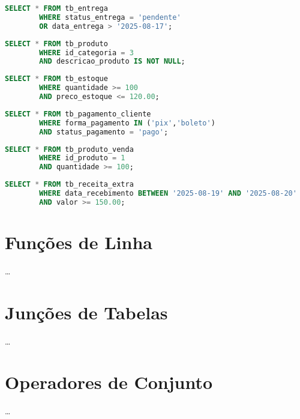 \documentclass[
12pt,
a4paper,
semrecuonosumario,
sumario = abnt-6027-2012]{report}
\begin{document}
    \begin{lstlisting}[language=SQL,caption={SELECT -- Tabela \texttt{tb\_entrega}}]
        SELECT * FROM tb_entrega
        WHERE status_entrega = 'pendente'
        OR data_entrega > '2025-08-17';
    \end{lstlisting}
    
    \begin{lstlisting}[language=SQL,caption={SELECT -- Tabela \texttt{tb\_produto}}]
        SELECT * FROM tb_produto
        WHERE id_categoria = 3
        AND descricao_produto IS NOT NULL;
    \end{lstlisting}
    
    \begin{lstlisting}[language=SQL,caption={SELECT -- Tabela \texttt{tb\_estoque}}]
        SELECT * FROM tb_estoque
        WHERE quantidade >= 100
        AND preco_estoque <= 120.00;
    \end{lstlisting}
    
    \begin{lstlisting}[language=SQL,caption={SELECT -- Tabela \texttt{tb\_pagamento\_cliente}}]
        SELECT * FROM tb_pagamento_cliente
        WHERE forma_pagamento IN ('pix','boleto')
        AND status_pagamento = 'pago';
    \end{lstlisting}
    
    \begin{lstlisting}[language=SQL,caption={SELECT -- Tabela \texttt{tb\_produto\_venda}}]
        SELECT * FROM tb_produto_venda
        WHERE id_produto = 1
        AND quantidade >= 100;
    \end{lstlisting}
    
    \begin{lstlisting}[language=SQL,caption={SELECT -- Tabela \texttt{tb\_receita\_extra}}]
        SELECT * FROM tb_receita_extra
        WHERE data_recebimento BETWEEN '2025-08-19' AND '2025-08-20'
        AND valor >= 150.00;
    \end{lstlisting}
    
    \section{Funções de Linha}
    \dots
    
    \section{Junções de Tabelas}
    \dots
    
    \section{Operadores de Conjunto}
    \dots
    
\end{document}
